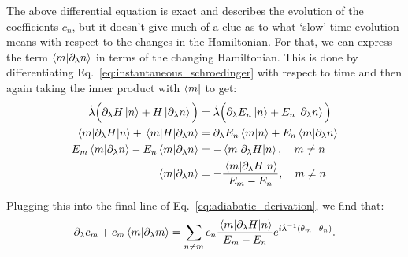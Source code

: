     The above differential equation is exact and describes the evolution of the coefficients $c_n$,  but it doesn't give much of a clue as to what `slow' time evolution means with respect to the changes in the Hamiltonian. For that, we can express the term $\braket{m}{\partial_{\lambda} n}$ in terms of the changing Hamiltonian. This is done by differentiating Eq.~\eqref{eq:instantaneous_schroedinger} with respect to time and then again taking the inner product with $\bra{m}$ to get:
    \begin{equation}\label{eq:hamiltonian_derivative}
        \begin{aligned}
            \dot{\lambda} \Big(\partial_{\lambda}{H}\ket{n} + H \ket{\partial_{\lambda} n}\Big)  &= \dot{\lambda} \Big(\partial_{\lambda}{E_n}\ket{n} + E_n \ket{\partial_{\lambda} n}\Big) \\
            \mel{m}{\partial_{\lambda}H}{n} + \mel{m}{H}{\partial_{\lambda}n} &= \partial_{\lambda} E_n\braket{m}{n} + E_n \braket{m}{\partial_{\lambda} n} \\
            E_m \braket{m}{\partial_{\lambda} n} - E_n \braket{m}{\partial_{\lambda} n} &= - \mel{m}{\partial_{\lambda}H}{n}, \quad m \neq n \\
            \braket{m}{\partial_{\lambda} n} &= - \frac{\mel{m}{\partial_{\lambda}H}{n}}{E_m - E_n}, \quad m \neq n
        \end{aligned}
    \end{equation}
    
    Plugging this into the final line of Eq.~\eqref{eq:adiabatic_derivation}, we find that:
    \begin{equation}\label{eq:coefficient_exact}
            \partial_{\lambda} c_m + c_m \braket{m}{\partial_{\lambda} m} = \sum_{n \neq m} c_n  \frac{\mel{m}{\partial_{\lambda}H}{n}}{E_m - E_n}e^{i \dot{\lambda}^{-1} (\theta_m-\theta_n)}.
    \end{equation}
    
